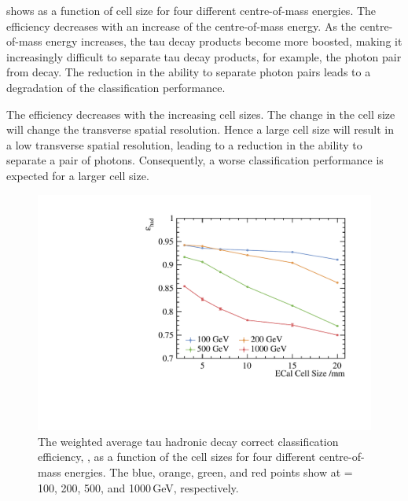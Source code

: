 shows \tauHad as a function of \ECAL cell size for four different centre-of-mass energies. The efficiency \tauHad decreases with an increase of the centre-of-mass energy. As the centre-of-mass energy increases, the tau decay products become more boosted, making it increasingly difficult to separate tau decay products, for example, the photon pair from \Ppizero decay. The reduction in the ability to separate photon pairs leads to a degradation of  the classification performance.

 The efficiency \tauHad decreases with the  increasing \ECAL cell sizes. The change in the \ECAL cell size will change the \ECAL transverse spatial resolution. Hence a large cell size will result in a low transverse spatial resolution, leading to a reduction in the ability to separate a pair of photons. Consequently, a worse classification performance is expected for a larger \ECAL cell size.


\begin{figure}[htbp]
\centering %
\includegraphics[width=.85\textwidth]{tau/plots3/hadronicEff.pdf}
\caption[The tau hadronic decay efficiency as a function of  the \ECAL cell sizes at different \sqrtS with the \ILD detector model.]
{The weighted average tau hadronic decay correct classification efficiency, \tauHad, as a function of  the \ECAL cell sizes for four different centre-of-mass energies. The blue, orange, green, and red points  show \tauHad at \sqrtS = 100, 200, 500, and 1000\,GeV, respectively.}
\label{fig:TauHadronicEfficiency}
\end{figure}

